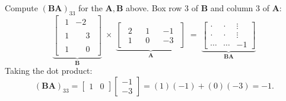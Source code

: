 \begin{example}
  Compute $(\mathbf{B}\mathbf{A})_{33}$ for the $\mathbf{A}, \mathbf{B}$ above. Box row $3$ of $\mathbf{B}$ and column $3$ of $\mathbf{A}$:
  \[
    \underbrace{
      \begin{bmatrix}
        \begin{matrix}
          1 & -2
        \end{matrix}
        \\
        \begin{matrix}
          1 & \phantom{-}3
        \end{matrix}
        \\
        \boxed{
          \begin{matrix}
            1 & \phantom{-}0
          \end{matrix}
        }
      \end{bmatrix}
    }_{\mathbf{B}}
    \;\times\;
    \underbrace{
      \begin{bmatrix}
        \begin{matrix}
          2 \\ 1
        \end{matrix}
         &
        \begin{matrix}
          1 \\ 0
        \end{matrix}
         &
        \boxed{
          \begin{matrix}
            -1 \\ -3
          \end{matrix}
        }
      \end{bmatrix}
    }_{\mathbf{A}}
    \;=\;
    \underbrace{\left[
        \begin{array}{cc|c}
          \cdot  & \cdot  & \vdots \\
          \cdot  & \cdot  & \vdots \\ \hline
          \cdots & \cdots & -1
        \end{array}
        \right]}_{\mathbf{B}\mathbf{A}}
  \]
  Taking the dot product:
  \[
    (\mathbf{B}\mathbf{A})_{33}
    =
    \begin{bmatrix}
      1 & 0
    \end{bmatrix}
    \begin{bmatrix}
      -1 \\ -3
    \end{bmatrix}
    = (1)(-1) + (0)(-3) = -1.
  \]
\end{example}

